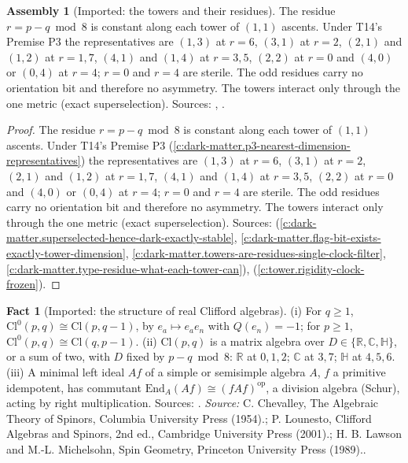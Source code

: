 \documentclass[11pt]{article}
\theoremstyle{definition}
\newtheorem{fact}[theorem]{Fact}
\newtheorem{assembled}[theorem]{Assembly}
\theoremstyle{plain}
\newcommand{\changedmark}[2]{\marginpar{\raggedright\scriptsize\color{#1}#2}}
\providecommand{\C}{}\renewcommand{\C}{\mathbb{C}}
\providecommand{\Cl}{}\renewcommand{\Cl}{\mathrm{Cl}}
\providecommand{\HH}{}\renewcommand{\HH}{\mathbb{H}}
\providecommand{\R}{}\renewcommand{\R}{\mathbb{R}}
\begin{document}
\begin{assembled}[Imported: the towers and their residues]\label{c:dark-tower-matter.imported-towers-their-types}
\changedmark{BurntOrange}{changed since the deposit}
The residue $r = p - q \bmod 8$ is constant along each tower of $(1,1)$ ascents. Under T14's Premise P3 the representatives are $(1,3)$ at $r = 6$, $(3,1)$ at $r = 2$, $(2,1)$ and $(1,2)$ at $r = 1, 7$, $(4,1)$ and $(1,4)$ at $r = 3, 5$, $(2,2)$ at $r = 0$ and $(4,0)$ or $(0,4)$ at $r = 4$; $r = 0$ and $r = 4$ are sterile. The odd residues carry no orientation bit and therefore no asymmetry. The towers interact only through the one metric (exact superselection). Sources: \cite[Prop.~3.1, Thm.~3.4, Thm.~3.10, Prop.~4.1]{ButlerT14}, \cite[Thm.~3.6]{ButlerT3}.
\end{assembled}
\begin{proof}
The residue $r = p - q \bmod 8$ is constant along each tower of $(1,1)$ ascents. Under T14's Premise P3 (\ref{c:dark-matter.p3-nearest-dimension-representatives}) the representatives are $(1,3)$ at $r = 6$, $(3,1)$ at $r = 2$, $(2,1)$ and $(1,2)$ at $r = 1, 7$, $(4,1)$ and $(1,4)$ at $r = 3, 5$, $(2,2)$ at $r = 0$ and $(4,0)$ or $(0,4)$ at $r = 4$; $r = 0$ and $r = 4$ are sterile. The odd residues carry no orientation bit and therefore no asymmetry. The towers interact only through the one metric (exact superselection). Sources: \cite[Prop.~3.1, Thm.~3.4, Thm.~3.10, Prop.~4.1]{ButlerT14} (\ref{c:dark-matter.superselected-hence-dark-exactly-stable}, \ref{c:dark-matter.flag-bit-exists-exactly-tower-dimension}, \ref{c:dark-matter.towers-are-residues-single-clock-filter}, \ref{c:dark-matter.type-residue-what-each-tower-can}), \cite[Thm.~3.6]{ButlerT3} (\ref{c:tower.rigidity-clock-frozen}).

\end{proof}

\begin{fact}[Imported: the structure of real Clifford algebras]\label{c:dark-tower-matter.imported-clifford-structure}
(i) For $q \geq 1$, $\Cl^{0}(p,q) \cong \Cl(p,q-1)$, by $e_{a} \mapsto e_{a}e_{n}$ with $Q(e_{n}) = -1$; for $p \geq 1$, $\Cl^{0}(p,q) \cong \Cl(q, p-1)$. (ii) $\Cl(p,q)$ is a matrix algebra over $D \in \{\R, \C, \HH\}$, or a sum of two, with $D$ fixed by $p - q \bmod 8$: $\R$ at $0, 1, 2$; $\C$ at $3, 7$; $\HH$ at $4, 5, 6$. (iii) A minimal left ideal $Af$ of a simple or semisimple algebra $A$, $f$ a primitive idempotent, has commutant $\mathrm{End}_{A}(Af) \cong (fAf)^{\mathrm{op}}$, a division algebra (Schur), acting by right multiplication. Sources: \cite{Chevalley1954, Lounesto2001, LawsonMichelsohn1989}.
\emph{Source:} C. Chevalley, The Algebraic Theory of Spinors, Columbia University Press (1954).; P. Lounesto, Clifford Algebras and Spinors, 2nd ed., Cambridge University Press (2001).; H. B. Lawson and M.-L. Michelsohn, Spin Geometry, Princeton University Press (1989)..
\end{fact}
\end{document}
